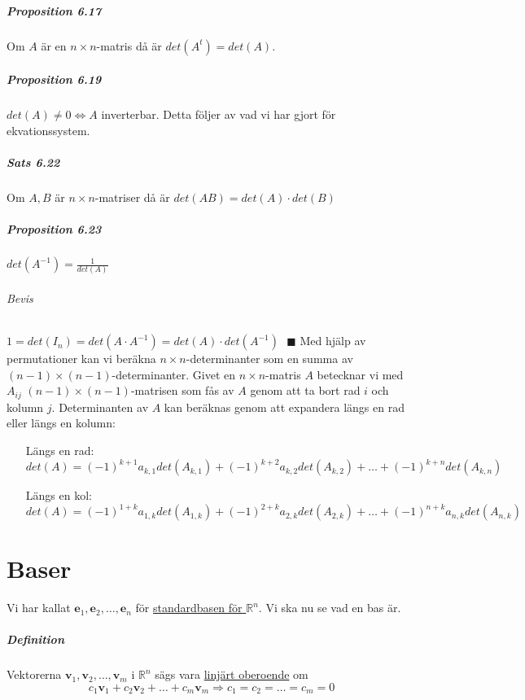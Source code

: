 \paragraph{Proposition 6.17} Om $A$ är en $n\times n$-matris då är $det(A^{t})=det(A)$.

\paragraph{Proposition 6.19} $det(A)\neq 0 \Leftrightarrow A$ inverterbar.
Detta följer av vad vi har gjort för ekvationssystem.

\paragraph{Sats 6.22} Om $A,B$ är $n\times n$-matriser då är $det(AB)=det(A)\cdot det(B)$

\paragraph{Proposition 6.23} $det(A^{-1})=\frac{1}{det(A)}$
\subparagraph{Bevis}
$1=det(I_{n})=det(A\cdot A^{-1})=det(A)\cdot det(A^{-1}) \text{ } \blacksquare$
\clearpage
Med hjälp av permutationer kan vi beräkna $n\times n$-determinanter som en summa av $(n-1)\times (n-1)$-determinanter.
Givet en $n\times n$-matris $A$ betecknar vi med $A_{ij}$ $(n-1)\times (n-1)$-matrisen som fås av $A$ genom att ta bort rad $i$ och kolumn $j$.
Determinanten av $A$ kan beräknas genom att expandera längs en rad eller längs  en kolumn:
\begin{enumerate}
    \item[Längs en rad:] ~\\
        $det(A)=(-1)^{k+1}a_{k,1} det(A_{k,1})+(-1)^{k+2}a_{k,2}det(A_{k,2})+\ldots+(-1)^{k+n}det(A_{k,n})$
    \item[Längs en kol:] ~\\
        $det(A)=(-1)^{1+k}a_{1,k}det(A_{1,k})+(-1)^{2+k}a_{2,k}det(A_{2,k})+\ldots+(-1)^{n+k}a_{n,k}det(A_{n,k})$
\end{enumerate}

\chapter{Baser}
Vi har kallat $\bm{e}_{1},\bm{e}_{2},\ldots,\bm{e}_{n}$ för \underline{standardbasen för $\mathbb{R}^{n}$}.
Vi ska nu se vad en bas är.

\paragraph{Definition} Vektorerna $\bm{v}_{1},\bm{v}_{2},\ldots,\bm{v}_{m}$ i $\mathbb{R}^{n}$ sägs vara \underline{linjärt oberoende} om
\begin{equation*}
    c_{1}\bm{v}_{1}+c_{2}\bm{v}_{2}+\ldots+c_{m}\bm{v}_{m}\Rightarrow c_{1}=c_{2}=\ldots=c_{m}=0
\end{equation*}

